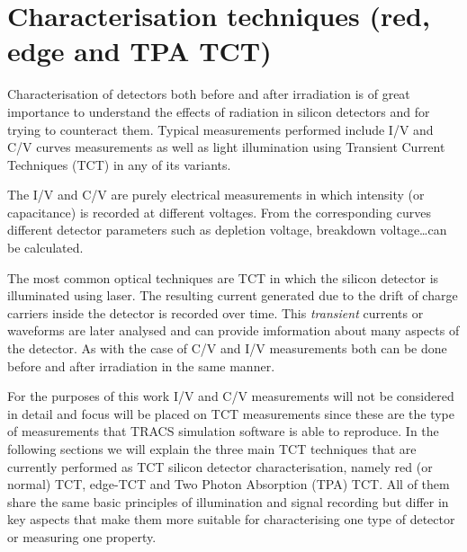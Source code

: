\chapter{Characterisation techniques (red, edge and TPA TCT)}
\label{chap:TCT}

Characterisation of detectors both before and after irradiation is of great importance to understand the effects of radiation in silicon detectors and for trying to counteract them. Typical measurements performed include I/V and C/V curves measurements as well as light illumination using Transient Current Techniques (TCT) in any of its variants. 


The I/V and C/V are purely electrical measurements in which intensity (or capacitance) is recorded at different voltages. From the corresponding curves different detector parameters such as depletion voltage, breakdown voltage\ldots can be calculated. 

The most common optical techniques are TCT in which the silicon detector is illuminated using laser. The resulting current generated due to the drift of charge carriers inside the detector is recorded over time. This \textit{transient} currents or waveforms are later analysed and can provide imformation about many aspects of the detector. As with the case of C/V and I/V measurements both can be done before and after irradiation in the same manner.

For the purposes of this work I/V and C/V measurements will not be considered in detail and focus will be placed on TCT measurements since these are the type of measurements that TRACS simulation software is able to reproduce. In the following sections we will explain the three main TCT techniques that are currently performed as TCT silicon detector characterisation, namely red (or normal) TCT, edge-TCT and Two Photon Absorption (TPA) TCT. All of them share the same basic principles of illumination and signal recording but differ in key aspects that make them more suitable for characterising one type of detector or measuring one property. 

